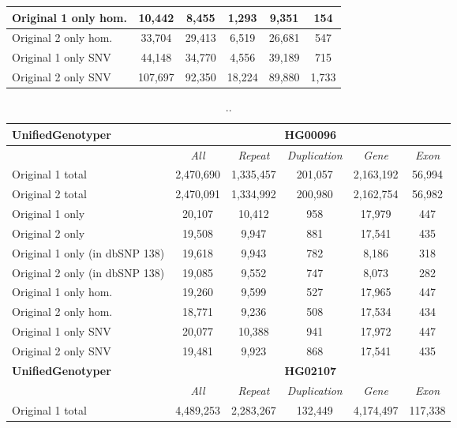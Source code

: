 \begin{table}[htb]
\begin{center}
\begin{tabular}{|l|c||c|c|c|c|}
\hline
Original 1 only hom. & 10,442    & 8,455     & 1,293   & 9,351     & 154     \\
\hline
Original 2 only hom. & 33,704    & 29,413    & 6,519   & 26,681    & 547     \\
\hline
Original 1 only SNV & 44,148    & 34,770    & 4,556   & 39,189    & 715     \\
\hline
Original 2 only SNV & 107,697   & 92,350    & 18,224  & 89,880    & 1,733   \\
\hline
\end{tabular}
\end{center}
\label{tab:orig-vs-orig2-hc}
\end{table}

\begin{table}[htb]
\caption{ .. }
\begin{center}
\begin{tabular}{|l|c||c|c|c|c|}
\hline
{\bf UnifiedGenotyper} & \multicolumn{5}{|c|}{\bf HG00096} \\
\hline
\cline{2-6}
{\bf} & {\it All} & {\it Repeat} & {\it Duplication} & {\it Gene} & {\it Exon} \\
\hline
Original 1 total & 2,470,690 & 1,335,457 & 201,057 & 2,163,192 & 56,994 \\
\hline
Original 2 total & 2,470,091 & 1,334,992 & 200,980 & 2,162,754 & 56,982 \\
\hline
Original 1 only & 20,107 & 10,412 & 958 & 17,979 & 447 \\
\hline
Original 2 only & 19,508 & 9,947 & 881 & 17,541 & 435 \\
\hline
Original 1 only (in dbSNP 138) & 19,618 & 9,943 & 782 & 8,186 & 318 \\
\hline
Original 2 only (in dbSNP 138) & 19,085 & 9,552 & 747 & 8,073 & 282 \\
\hline
Original 1 only hom. & 19,260 & 9,599 & 527 & 17,965 & 447 \\
\hline
Original 2 only hom. & 18,771 & 9,236 & 508 & 17,534 & 434 \\
\hline
Original 1 only SNV & 20,077 & 10,388 & 941 & 17,972 & 447 \\
\hline
Original 2 only SNV & 19,481 & 9,923 & 868 & 17,541 & 435 \\
\hline
\hline
{\bf UnifiedGenotyper} & \multicolumn{5}{|c|}{\bf HG02107} \\
\hline
\cline{2-6}
{\bf} & {\it All} & {\it Repeat} & {\it Duplication} & {\it Gene} & {\it Exon} \\
\hline
Original 1 total & 4,489,253 & 2,283,267 & 132,449 & 4,174,497 & 117,338 \\

\end{tabular}
\end{center}
\end{table}
